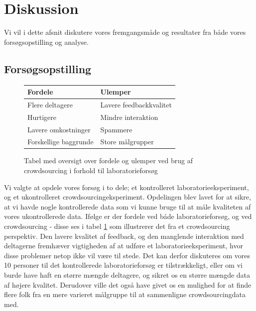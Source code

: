 \chapter*{Diskussion}
Vi vil i dette afsnit diskutere vores fremgangsmåde og resultater fra både vores forsøgsopstilling og analyse.

\section*{Forsøgsopstilling}

\begin{figure}
	\centering
	\begin{tabular}{ll}
		\textbf{Fordele} & \textbf{Ulemper}\\\hline
		Flere deltagere & Lavere feedbackkvalitet\\
		Hurtigere & Mindre interaktion\\
		Lavere omkostninger & Spammere\\
		Forskellige baggrunde & Store målgrupper\\
	\end{tabular}
	\caption{Tabel med oversigt over fordele og ulemper ved brug af crowdsourcing i forhold til laboratorieforsøg \cite{liu2012crowdsourcing}}
	\label{tab:fordeleogulemper}
\end{figure}

Vi valgte at opdele vores forsøg i to dele; et kontrolleret laboratorieeksperiment, og et ukontrolleret crowdsourcingeksperiment. Opdelingen blev lavet for at sikre, at vi havde nogle kontrollerede data som vi kunne bruge til at måle kvaliteten af vores ukontrollerede data. Ifølge \cite{liu2012crowdsourcing} er der fordele ved både laboratorieforsøg, og ved crowdsourcing - disse ses i tabel \ref{tab:fordeleogulemper} som illustrerer det fra et crowdsourcing perspektiv. Den lavere kvalitet af feedback, og den manglende interaktion med deltagerne fremhæver vigtigheden af at udføre et laboratorieeksperiment, hvor disse problemer netop ikke vil være til stede\cite{liu2012crowdsourcing}. Det kan derfor diskuteres om vores 10 personer til det kontrollerede laboratorieforsøg er tilstrækkeligt, eller om vi burde have haft en større mængde deltagere, og sikret os en større mængde data af højere kvalitet. Derudover ville det også have givet os en mulighed for at finde flere folk fra en mere varieret målgruppe til at sammenligne crowdsourcingdata med.

